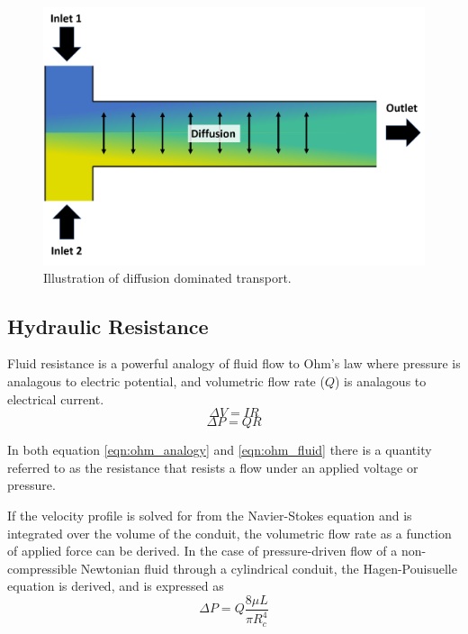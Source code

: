 \begin{figure}[ht]
    \centering
    \includegraphics[width=\textwidth]{images/diffusion_illustration.png}
    \caption{Illustration of diffusion dominated transport.}
    \label{fig:diffusion_ilustration}
\end{figure} 


\subsection*{Hydraulic Resistance}

\par Fluid resistance is a powerful analogy of fluid flow to Ohm's law where pressure is analagous to electric potential, and volumetric flow rate ($Q$) is analagous to electrical current. 
\begin{equation}
    \Delta V = I R
    \label{eqn:ohm_analogy}
\end{equation}
\begin{equation}
    \Delta P = Q R
    \label{eqn:ohm_fluid}
\end{equation}

\noindent In both equation \ref{eqn:ohm_analogy} and \ref{eqn:ohm_fluid} there is a quantity referred to as the resistance that resists a flow under an applied voltage or pressure. 

\par If the velocity profile is solved for from the Navier-Stokes equation and is integrated over the volume of the conduit, the volumetric flow rate as a function of applied force can be derived. In the case of pressure-driven flow of a non-compressible Newtonian fluid through a cylindrical conduit, the Hagen-Pouisuelle equation is derived, and is expressed as
\begin{equation}
    \Delta P = Q \frac{8\mu L}{\pi R_c^4}
\end{equation}

